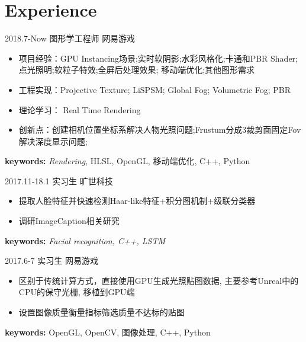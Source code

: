 \documentclass[]{cv-style} %
\begin{document}
\section{Experience}
\begin{entrylist}

\entry
  {2018.7-Now}
  {图形学工程师}
  {网易游戏}
  {
    \vspace{-5pt}
    \leftmargini=-1cm
    \begin{itemize}
      \setlength{\itemsep}{3pt}
      \item {项目经验：GPU Instancing场景;实时软阴影;水彩风格化;卡通和PBR Shader; \\点光照明;软粒子特效;全屏后处理效果; 移动端优化;其他图形需求}
      \item {工程实现：Projective Texture; LiSPSM; Global Fog; Volumetric Fog; PBR}
      \item {理论学习： Real Time Rendering}
      \item {创新点：创建相机位置坐标系解决人物光照问题;Frustum分成3裁剪面固定Fov\\解决深度显示问题;}
    \end{itemize}
    \vspace{5pt}
    \hspace{-1.2cm} \textbf{keywords:} \emph{Rendering}, HLSL, OpenGL, 移动端优化, C++, Python
  }

\entry
  {2017.11-18.1}
  {实习生}
  {旷世科技}
  {
    \vspace{-5pt}
    \leftmargini=-1cm
    \begin{itemize}
      \setlength{\itemsep}{3pt}
      \item {提取人脸特征并快速检测Haar-like特征+积分图机制+级联分类器}
      \item {调研ImageCaption相关研究}
    \end{itemize}
    \vspace{5pt}
    \hspace{-1.2cm} \textbf{keywords:} \emph{Facial recognition, C++, LSTM}
  }

\entry
  {2017.6-7}
  {实习生}
  {网易游戏}
  {
    \vspace{-5pt}
    \leftmargini=-1cm
    \begin{itemize}
      \setlength{\itemsep}{3pt}
      \item {区别于传统计算方式，直接使用GPU生成光照贴图数据, 主要参考Unreal中的\\CPU的保守光栅, 移植到GPU端}
      \item {设置图像质量衡量指标筛选质量不达标的贴图}
    \end{itemize}
    \vspace{5pt}
    \hspace{-1.2cm} \textbf{keywords:} OpenGL, OpenCV, 图像处理, C++, Python
  }


\end{entrylist}
\end{document}
